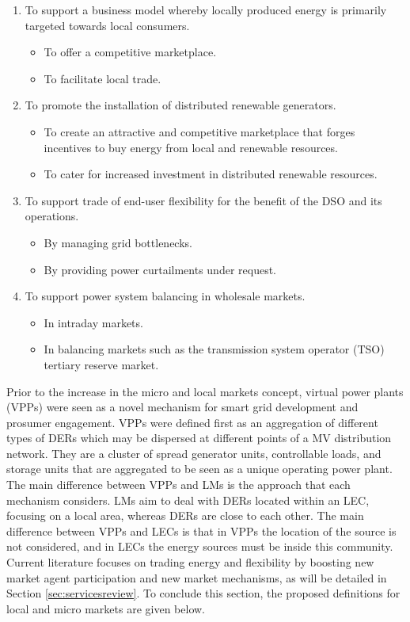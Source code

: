 \begin{enumerate}
\item To support a business model whereby locally produced energy is primarily targeted towards local
consumers.
\begin{itemize}
\item To offer a competitive marketplace.
\item To facilitate local trade.
\end{itemize}
\item To promote the installation of distributed renewable generators.
\begin{itemize}
\item To create an attractive and competitive marketplace that forges incentives to buy energy from local
and renewable resources.
\item To cater for increased investment in distributed renewable resources.
\end{itemize}
\item To support trade of end-user flexibility for the benefit of the DSO and its operations.
\begin{itemize}
\item By managing grid bottlenecks.
\item By providing power curtailments under request.
\end{itemize}
\item To support power system balancing in wholesale markets.
\begin{itemize}
\item In intraday markets.
\item In balancing markets such as the transmission system operator (TSO) tertiary reserve market.
\end{itemize}
\end{enumerate}

\vspace{-2mm}

Prior to the increase in the micro and local markets concept, virtual power plants (VPPs) were seen as a novel mechanism for smart grid development and prosumer engagement. VPPs were defined first as an aggregation of different types of DERs which may be dispersed at different points of a MV distribution network. They are a cluster of spread generator units, controllable loads, and storage units that are aggregated to be seen as a unique operating power plant. The main difference between VPPs and LMs is the approach that each mechanism considers. LMs aim to deal with DERs located within an LEC, focusing on a local area, whereas DERs are close to each other. The main difference between VPPs and LECs is that in VPPs the location of the source is not considered, and in LECs the energy sources must be inside this community. Current literature focuses on trading energy and flexibility by boosting new market agent participation and new market mechanisms, as will be detailed in Section \ref{sec:servicesreview}. To conclude this section, the proposed definitions for local and micro markets are given below.
\vspace{1mm}

